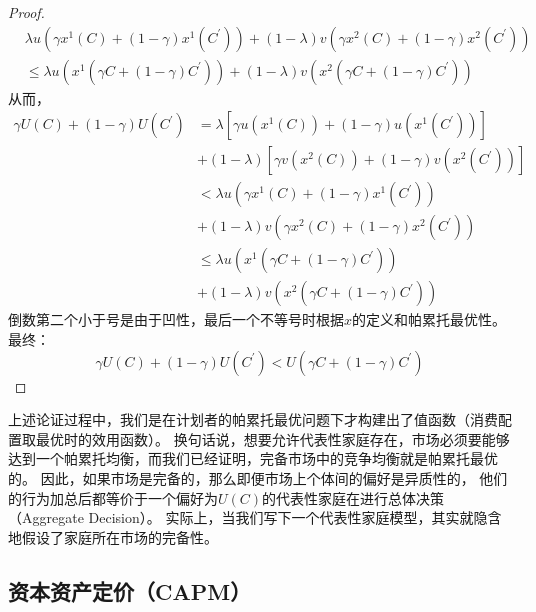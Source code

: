 \begin{proof}
    \begin{equation*}
        \begin{aligned}
            & \lambda u\left(\gamma x^1(C)+(1-\gamma) x^1\left(C^{\prime}\right)\right)
                +(1-\lambda) v\left(\gamma x^2(C)+(1-\gamma) x^2\left(C^{\prime}\right)\right) \\
            &\leq \lambda u\left(x^1\left(\gamma C+(1-\gamma) C^{\prime}\right)\right)
                +(1-\lambda) v\left(x^2\left(\gamma C+(1-\gamma) C^{\prime}\right)\right)
        \end{aligned}
    \end{equation*}
    从而，
    \begin{equation*}
        \begin{aligned}
            \gamma U(C)+(1-\gamma) U\left(C^{\prime}\right)
            &= \lambda\left[\gamma u\left(x^1(C)\right)+(1-\gamma) u\left(x^1\left(C^{\prime}\right)\right)\right] \\
                & +(1-\lambda)\left[\gamma v\left(x^2(C)\right)+(1-\gamma) v\left(x^2\left(C^{\prime}\right)\right)\right] \\
            &< \lambda u\left(\gamma x^1(C)+(1-\gamma) x^1\left(C^{\prime}\right)\right) \\
                &+(1-\lambda) v\left(\gamma x^2(C)+(1-\gamma) x^2\left(C^{\prime}\right)\right) \\
            &\leq \lambda u\left(x^1\left(\gamma C+(1-\gamma) C^{\prime}\right)\right) \\
                &+(1-\lambda) v\left(x^2\left(\gamma C+(1-\gamma) C^{\prime}\right)\right)
        \end{aligned}
    \end{equation*}
    倒数第二个小于号是由于凹性，最后一个不等号时根据$x$的定义和帕累托最优性。最终：
    \begin{equation*}
        \gamma U(C)+(1-\gamma) U\left(C^{\prime}\right) < U\left(\gamma C+\left(1-\gamma\right)C^{\prime}\right)
    \end{equation*}
\end{proof}

上述论证过程中，我们是在计划者的帕累托最优问题下才构建出了值函数（消费配置取最优时的效用函数）。
换句话说，想要允许代表性家庭存在，市场必须要能够达到一个帕累托均衡，而我们已经证明，完备市场中的竞争均衡就是帕累托最优的。
因此，如果市场是完备的，那么即便市场上个体间的偏好是异质性的，
他们的行为加总后都等价于一个偏好为$U\left(C\right)$的代表性家庭在进行总体决策（Aggregate Decision）。
实际上，当我们写下一个代表性家庭模型，其实就隐含地假设了家庭所在市场的完备性。



\subsection{资本资产定价（CAPM）}  \label{sec-capm}
